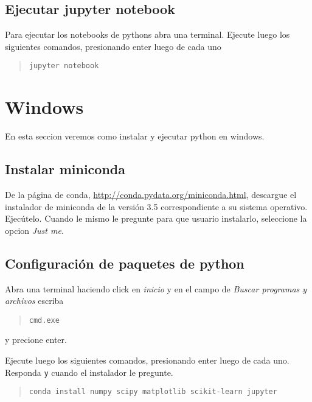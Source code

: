 \documentclass[hidelinks,12pt]{article}
\begin{document}
\subsection{Ejecutar jupyter notebook}
Para ejecutar los notebooks de pythons abra una terminal. Ejecute luego los 
siguientes comandos, presionando enter luego de cada uno

\begin{quote}
\begin{verbatim}
jupyter notebook
\end{verbatim}
\end{quote}

\section{Windows}
En esta seccion veremos como instalar y ejecutar python en windows.

\subsection{Instalar miniconda}

De la p\'agina de conda, \url{http://conda.pydata.org/miniconda.html}, descargue 
el instalador de miniconda de la versi\'on 3.5 correspondiente a su sistema
operativo. Ejec\'utelo. Cuando le mismo le pregunte para que usuario instalarlo,
seleccione la opcion \emph{Just me}.

\subsection{Configuraci\'on de paquetes de python}

Abra una terminal haciendo click en \emph{inicio} y en el campo de \emph{Buscar
programas y archivos} escriba 
\begin{quote}
\begin{verbatim}
cmd.exe
\end{verbatim}
\end{quote}
y precione enter.

Ejecute luego los siguientes comandos, presionando enter luego de cada uno. Responda 
\texttt{y} cuando el instalador le pregunte.

\begin{quote}
\begin{verbatim}
conda install numpy scipy matplotlib scikit-learn jupyter
\end{verbatim}
\end{quote}
\end{document}

